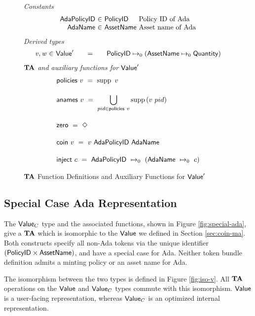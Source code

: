 \begin{figure*}[t!]
  \emph{Constants}
  \begin{equation*}
    \begin{array}{r@{~\in~}l@{~}lr}
      \mathsf{AdaPolicyID} & \PolicyID & \text{Policy ID of Ada} \\
      \mathsf{AdaName} & \AssetName & \text{Asset name of Ada}
    \end{array}
  \end{equation*}
  \emph{Derived types}
  \begin{equation*}
    \begin{array}{r@{~\in~}l@{\qquad=\qquad}lr}
      \var{v}, \var{w} & \Value'
      & \PolicyID \mapsto_0 ( \AssetName \mapsto_0 \Quantity )
    \end{array}
  \end{equation*}
  \emph{$\mathbf{TA}$ and auxiliary functions for $\mathsf{Value}'$}
  \begin{align*}
    & \fun{policies}~v ~=~ \supp{~v}
    \nextdef
    & \fun{anames}~v ~=~ \bigcup_{pid \in\fun{policies}{~v}} \supp{(v~pid)}
    \nextdef
    & \fun{zero} ~=~ \Nothing
    \nextdef
    & \fun{coin}~v ~=~ v~\mathsf{AdaPolicyID}~\mathsf{AdaName}
    \nextdef
    & \fun{inject}~c  ~=~ \mathsf{AdaPolicyID}~\mapsto_0~(\mathsf{AdaName}~\mapsto_0~c)
  \end{align*}
  \caption{$\mathbf{TA}$ Function Definitions and Auxiliary Functions for $\mathsf{Value}'$}
  \label{fig:no-special-ada}
\end{figure*}


\subsection{Special Case Ada Representation}
\label{sec:coin-value}

The $\mathsf{Value}_C$ type and the associated functions, shown in Figure \ref{fig:special-ada},
give a $\mathbf{TA}$ which is isomorphic to the $\mathsf{Value}$ we defined in
Section \ref{sec:coin-ma}. Both constructs
specify all non-Ada tokens via the unique identifier $(\mathsf{PolicyID} \times \mathsf{AssetName})$, and
have a special case for Ada. Neither token bundle definition
admits a minting policy or an asset name for Ada.

The isomorphism between the two types is defined in Figure \ref{fig:iso-v}.
All $\mathbf{TA}$ operations on the $\mathsf{Value}$ and $\mathsf{Value}_C$ types commute with this
isomorphism. $\mathsf{Value}$ is a user-facing representation, whereas $\mathsf{Value}_C$
is an optimized internal representation.

